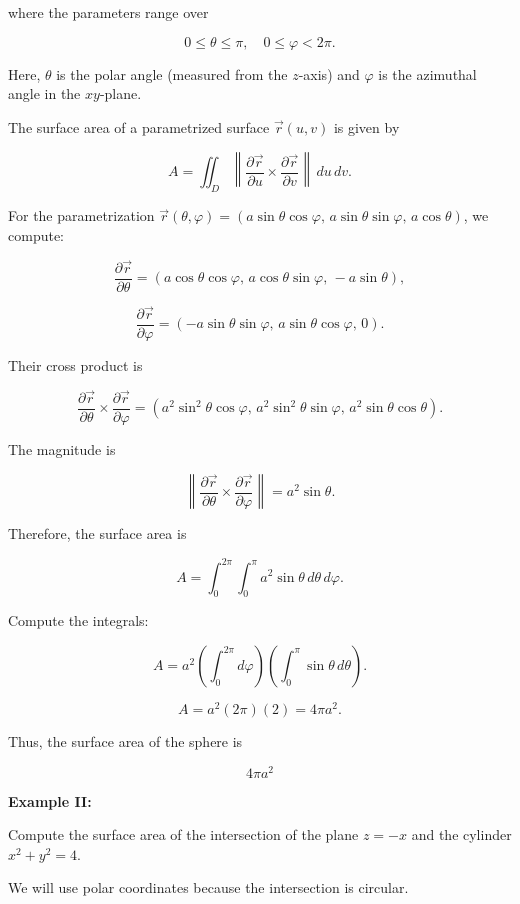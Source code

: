where the parameters range over

\[
    0 \leq \theta \leq \pi, \quad 0 \leq \varphi < 2\pi.
\]

Here, \(\theta\) is the polar angle (measured from the \(z\)-axis) and \(\varphi\) is the azimuthal angle in the \(xy\)-plane.

The surface area of a parametrized surface \(\vec{r}(u,v)\) is given by

\[
    A = \iint_{D} \left\| \frac{\partial \vec{r}}{\partial u} \times \frac{\partial \vec{r}}{\partial v} \right\| \, du \, dv.
\]

For the parametrization \(\vec{r}(\theta,\varphi) = (a\sin\theta\cos\varphi, \, a\sin\theta\sin\varphi, \, a\cos\theta)\), we compute:

\[
    \frac{\partial \vec{r}}{\partial \theta} = (a \cos\theta \cos\varphi, \, a \cos\theta \sin\varphi, \, -a \sin\theta),
\]

\[
    \frac{\partial \vec{r}}{\partial \varphi} = (-a \sin\theta \sin\varphi, \, a \sin\theta \cos\varphi, \, 0).
\]

Their cross product is

\[
    \frac{\partial \vec{r}}{\partial \theta} \times \frac{\partial \vec{r}}{\partial \varphi} 
    = (a^{2}\sin^{2}\theta \cos\varphi, \, a^{2}\sin^{2}\theta \sin\varphi, \, a^{2}\sin\theta \cos\theta).
\]

The magnitude is

\[
    \left\| \frac{\partial \vec{r}}{\partial \theta} \times \frac{\partial \vec{r}}{\partial \varphi} \right\|
    = a^{2} \sin\theta.
\]

Therefore, the surface area is

\[
    A = \int_{0}^{2\pi} \int_{0}^{\pi} a^{2} \sin\theta \, d\theta \, d\varphi.
\]

Compute the integrals:

\[
    A = a^{2} \left( \int_{0}^{2\pi} d\varphi \right) \left( \int_{0}^{\pi} \sin\theta \, d\theta \right).
\]

\[
    A = a^{2} (2\pi)(2) = 4\pi a^{2}.
\]

Thus, the surface area of the sphere is

\[
    4\pi a^{2}
\]

\QED

\textbf{Example II:}

Compute the surface area of the intersection of the plane \(z = -x\) and the cylinder \(x^2 + y^2 = 4\). 

We will use polar coordinates because the intersection is circular. 

